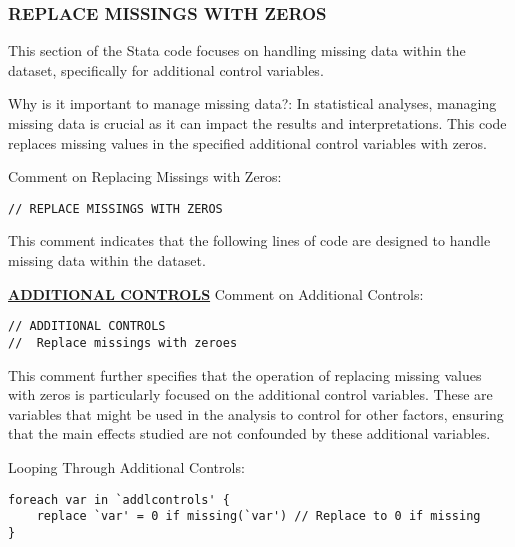 \documentclass{article}
\begin{document}
\subsubsection{REPLACE MISSINGS WITH ZEROS}

\vspace{0.3cm}This section of the Stata code focuses on handling missing data within the dataset, specifically for additional control variables. \newline

Why is it important to manage missing data?: In statistical analyses, managing missing data is crucial as it can impact the results and interpretations. This code replaces missing values in the specified additional control variables with zeros. \newline

Comment on Replacing Missings with Zeros:

\begin{mdframed}
\begin{verbatim}
// REPLACE MISSINGS WITH ZEROS
\end{verbatim}
\end{mdframed}

This comment indicates that the following lines of code are designed to handle missing data within the dataset.


\underline{\textbf{ADDITIONAL CONTROLS}}
\vspace{0.3cm} Comment on Additional Controls:

\begin{mdframed}
\begin{verbatim}
// ADDITIONAL CONTROLS 
// 	Replace missings with zeroes
\end{verbatim}
\end{mdframed}

\vspace{0.3cm} This comment further specifies that the operation of replacing missing values with zeros is particularly focused on the additional control variables. These are variables that might be used in the analysis to control for other factors, ensuring that the main effects studied are not confounded by these additional variables. \newline

Looping Through Additional Controls:
\begin{mdframed}
\begin{verbatim}
foreach var in `addlcontrols' {
    replace `var' = 0 if missing(`var') // Replace to 0 if missing 
}
\end{verbatim}
\end{mdframed}
\end{document}
